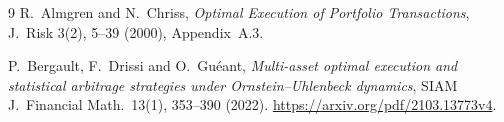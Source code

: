 \documentclass[11pt,a4paper]{article}
\begin{document}
\begin{thebibliography}{9}
 R.~Almgren and N.~Chriss,
\emph{Optimal Execution of Portfolio Transactions}, J.~Risk 3(2), 5--39
(2000), Appendix~A.3.

 P.~Bergault, F.~Drissi and O.~Gu\'eant,
\emph{Multi-asset optimal execution and statistical arbitrage strategies
under Ornstein--Uhlenbeck dynamics}, SIAM J.~Financial Math.~13(1),
353--390 (2022). \url{https://arxiv.org/pdf/2103.13773v4}.

\end{thebibliography}
\end{document}
